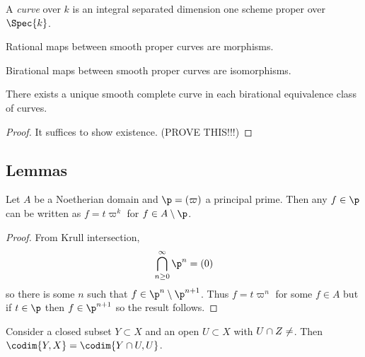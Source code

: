 \documentclass[12pt]{article}
\begin{document}
\begin{defn}
A \textit{curve} over $k$ is an integral separated dimension one scheme proper over $\Spec{k}$.
\end{defn}

\begin{cor}
Rational maps between smooth proper curves are morphisms.
\end{cor}

\begin{cor}
Birational maps between smooth proper curves are isomorphisms.
\end{cor}

\begin{thm}
There exists a unique smooth complete curve in each birational equivalence class of curves.
\end{thm}

\begin{proof}
It suffices to show existence. (PROVE THIS!!!)
\end{proof}

\subsection{Lemmas}

\begin{lemma} \label{principal_ideal_powers}
Let $A$ be a Noetherian domain and $\p = (\varpi)$ a principal prime. Then any $f \in \p$ can be written as $f = t \varpi^k$ for $f \in A \setminus \p$. 
\end{lemma}

\begin{proof}
From Krull intersection,
\[ \bigcap_{n \ge 0}^\infty \p^n = (0) \]
so there is some $n$ such that $f \in \p^n \setminus \p^{n+1}$. Thus $f = t \varpi^n$ for some $f \in A$ but if $t \in \p$ then $f \in \p^{n+1}$ so the result follows.
\end{proof}

\begin{lemma} \label{codimension_opens}
Consider a closed subset $Y \subset X$ and an open $U \subset X$ with $U \cap Z \neq \empty$. Then $\codim{Y, X} = \codim{Y \cap U, U}$. 
\end{lemma}
\end{document}
